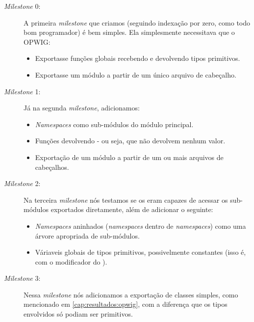\begin{description}
  \item[\textit{Milestone} 0:] A primeira \textit{milestone} que criamos (seguindo indexação
    por zero, como todo bom programador) é bem simples. Ela simplesmente necessitava que o
    OPWIG:
    \begin{itemize}
      \item Exportasse funções globais recebendo e devolvendo tipos primitivos.
      \item Exportasse um módulo a partir de um único arquivo de cabeçalho.
    \end{itemize}
    
  \item[\textit{Milestone} 1:] Já na segunda \textit{milestone}, adicionamos:
    \begin{itemize}
      \item \textit{Namespaces} como sub-módulos do módulo principal.
      \item Funções devolvendo  - ou seja, que não devolvem nenhum valor.
      \item Exportação de um módulo a partir de um ou mais arquivos de cabeçalhos.
    \end{itemize}
    
  \item[\textit{Milestone} 2:] Na terceira \textit{milestone} nós testamos se os
     eram capazes de acessar os sub-módulos exportados diretamente, além
    de adicionar o seguinte:
    \begin{itemize}
      \item \textit{Namespaces} aninhados (\textit{namespaces} dentro de \textit{namespaces})
        como uma árvore apropriada de sub-módulos.
      \item Váriaveis globais de tipos primitivos, possivelmente constantes
        (isso é, com o modificador  do \C{}).
    \end{itemize}
    
  \item[\textit{Milestone} 3:] Nessa \textit{milestone} nós adicionamos a exportação de classes
    simples, como mencionado em \ref{cap:resultados:opwig}, com a diferença que os tipos envolvidos
    só podiam ser primitivos.
    

\end{description}
